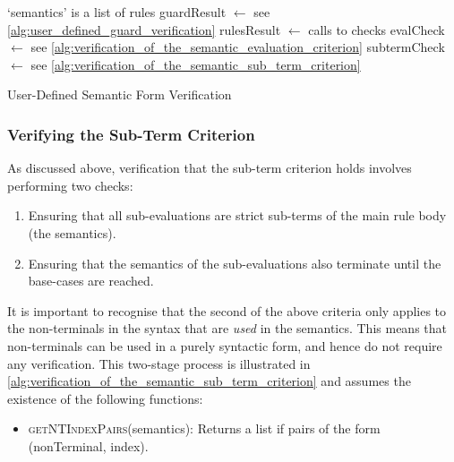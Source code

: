 \begin{algorithm}
\begin{algorithmic}
    \Comment `semantics' is a list of rules
    \State guardResult $\gets$ 
    \Comment see \autoref{alg:user_defined_guard_verification}
    \State rulesResult $\gets$ 
    \State {}
\EndFunction
\State
{}
    \Comment calls to checks
    \State evalCheck $\gets$ 
    \Comment see \autoref{alg:verification_of_the_semantic_evaluation_criterion}
    \State subtermCheck $\gets$ 
    \Comment see \autoref{alg:verification_of_the_semantic_sub_term_criterion}
    \State {}
\EndFunction
\end{algorithmic}
\caption{User-Defined Semantic Form Verification}
\label{alg:user_defined_semantic_form_verification}
\end{algorithm}


\subsubsection{Verifying the Sub-Term Criterion} %
\label{ssub:verifying_the_sub_term_criterion}
As discussed above, verification that the sub-term criterion holds involves performing two checks:
\begin{enumerate}
    \item Ensuring that all sub-evaluations are strict sub-terms of the main rule body (the semantics).
    \item Ensuring that the semantics of the sub-evaluations also terminate until the base-cases are reached. 
\end{enumerate}

It is important to recognise that the second of the above criteria only applies to the non-terminals in the syntax that are \textit{used} in the semantics.
This means that non-terminals can be used in a purely syntactic form, and hence do not require any verification.
This two-stage process is illustrated in \autoref{alg:verification_of_the_semantic_sub_term_criterion} and assumes the existence of the following functions:
\begin{itemize}
    \item \textsc{getNTIndexPairs}(semantics): Returns a list if pairs of the form (nonTerminal, index).
\end{itemize}

